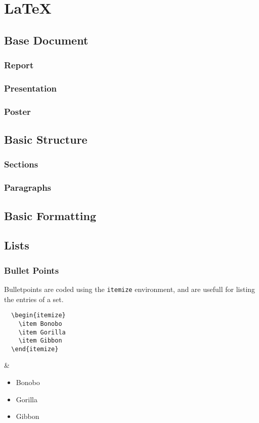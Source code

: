 \chapter{\LaTeX}
\label{latex}

\section{Base Document}

\subsection{Report}
\subsection{Presentation}
\subsection{Poster}

\section{Basic Structure}
\subsection{Sections}
\subsection{Paragraphs}

\section{Basic Formatting}

\section{Lists}
\subsection{Bullet Points}

Bulletpoints are coded using the \texttt{itemize} environment, and are usefull for listing the entries of a set.

\begin{latexdemo}
  \begin{verbatim}
  \begin{itemize}
    \item Bonobo
    \item Gorilla
    \item Gibbon
  \end{itemize}
  \end{verbatim}
  &
  \begin{itemize}
    \item Bonobo
    \item Gorilla
    \item Gibbon
  \end{itemize}
\end{latexdemo}

